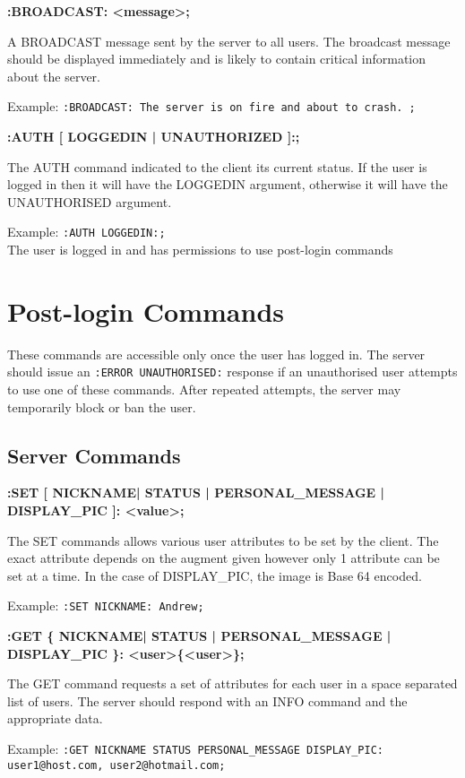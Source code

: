 {\bf :BROADCAST: <message>;}

A BROADCAST message sent by the server to all users. The broadcast message should be displayed immediately and is likely to contain critical information about the server.

Example:
\texttt{:BROADCAST: The server is on fire and about to crash. ;}

{\bf :AUTH [ LOGGEDIN | UNAUTHORIZED ]:;}

The AUTH command indicated to the client its current status. If the user is logged in then it will have the LOGGEDIN argument, otherwise it will have the UNAUTHORISED argument.

Example:
\texttt{:AUTH LOGGEDIN:;}\\
The user is logged in and has permissions to use post-login commands

\section{Post-login Commands}

These commands are accessible only once the user has logged in. The server should issue an \texttt{:ERROR UNAUTHORISED:} response if an unauthorised user attempts to use one of these commands. After repeated attempts, the server may temporarily block or ban the user.

\subsection{Server Commands}

{\bf :SET [ NICKNAME| STATUS | PERSONAL_MESSAGE | DISPLAY_PIC ]: <value>;}

The SET commands allows various user attributes to be set by the client. The exact attribute depends on the augment given however only 1 attribute can be set at a time. In the case of DISPLAY_PIC, the image is Base 64 encoded.

Example:
\texttt{:SET NICKNAME: Andrew;}

{\bf :GET \{ NICKNAME| STATUS | PERSONAL_MESSAGE | DISPLAY_PIC \}: <user>\{<user>\};}

The GET command requests a set of attributes for each user in a space separated list of users. The server should respond with an INFO command and the appropriate data.

Example:
\texttt{:GET NICKNAME STATUS PERSONAL_MESSAGE DISPLAY_PIC: user1@host.com, user2@hotmail.com;}

